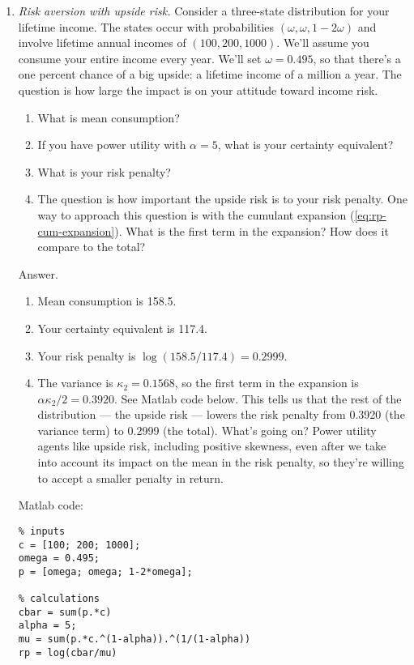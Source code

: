 \documentclass[11pt]{article}
\begin{document}
\begin{enumerate}
\item {\it Risk aversion with upside risk.\/}
Consider a three-state distribution for your lifetime income.
The states occur with probabilities $(\omega, \omega, 1-2\omega)$
and involve lifetime annual incomes of $(100, 200, 1000)$.
We'll assume you consume your entire income every year.
We'll set $\omega = 0.495$, so that there's a one percent chance
of a big upside:  a lifetime income of a million a year.
The question is how large the impact is on your attitude toward income risk.
%
\begin{enumerate}
\item What is mean consumption?
\item If you have power utility with $\alpha = 5$, what is your certainty equivalent?
\item What is your risk penalty?
\item The question is how important the upside risk is to your risk penalty.
One way to approach this question is with the cumulant expansion
(\ref{eq:rp-cum-expansion}).
What is the first term in the expansion?
How does it compare to the total?
\end{enumerate}
%
Answer.
\begin{enumerate}
\item Mean consumption is 158.5.
\item Your certainty equivalent is 117.4.
\item Your risk penalty is $ \log (158.5/117.4) = 0.2999$.
\item The variance is $\kappa_2 = 0.1568$, so the first term
in the expansion is $\alpha \kappa_2 / 2 = 0.3920$.
See Matlab code below.
This tells us that the rest of the distribution --- the upside risk ---
lowers the risk penalty from 0.3920 (the variance term) to 0.2999 (the total).
What's going on?
Power utility agents like upside risk, including positive skewness,
even after we take into account its impact on the mean in the risk penalty,
so they're willing to accept a smaller penalty in return.
\end{enumerate}

Matlab code:
\begin{verbatim}
% inputs
c = [100; 200; 1000];
omega = 0.495;
p = [omega; omega; 1-2*omega];

% calculations
cbar = sum(p.*c)
alpha = 5;
mu = sum(p.*c.^(1-alpha)).^(1/(1-alpha))
rp = log(cbar/mu)


\end{verbatim}
\end{enumerate}
\end{document}
